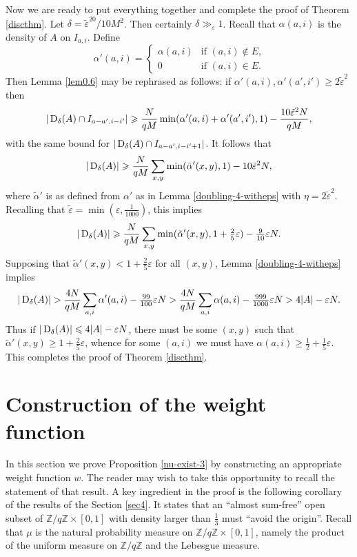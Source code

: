 \documentclass[10pt,reqno]{amsart}
\theoremstyle{definition}
\theoremstyle{remark}
\renewcommand{\leq}{\leqslant}
\renewcommand{\geq}{\geqslant}
\def\Z{\mathbb{Z}}
\def\eps{\varepsilon}
\numberwithin{equation}{section}
\begin{document}
Now we are ready to put everything together and complete the proof of Theorem \ref{discthm}. Let $\delta = {\tilde\eps}^{20}/10M^2$. Then certainly $\delta \gg_{\eps} 1$. Recall that $\alpha(a,i)$ is the density of $A$ on $I_{a,i}$. Define \[\alpha'(a,i) = \begin{cases} \alpha(a,i) & \text{if $(a,i)\notin E$,}\\ 0 & \text{if $(a,i)\in E$.}\end{cases}\] Then Lemma \ref{lem0.6} may be rephrased as follows: if $\alpha'(a,i), \alpha'(a',i') \geq 2{\tilde\eps}^2$ then \[ |\Sym_{\delta}(A) \cap I_{a - a', i - i'}| \geq \frac{N}{qM} \min (\alpha'(a,i) + \alpha'(a',i'), 1) - \frac{10{\tilde\eps}^2 N}{qM},\] with the same bound for $|\operatorname{D}_{\delta}(A) \cap I_{a - a', i - i' + 1}|$. It follows that  \[ |\Sym_{\delta}(A)| \geq \frac{N}{qM} \sum_{x,y} \min(\tilde{\alpha}'(x,y),1) - 10{\tilde\eps}^2 N,\] where $\tilde{\alpha}'$ is as defined from $\alpha'$ as in Lemma \ref{doubling-4-witheps} with $\eta = 2{\tilde\eps}^2$. Recalling that $\tilde\eps = \min(\eps,\frac{1}{1000})$, this implies \[|\Sym_{\delta}(A)| \geq \frac{N}{qM} \sum_{x,y} \min(\tilde{\alpha}'(x,y),1 + \tfrac{2}{5}{\eps}) - \tfrac{9}{10}{\eps} N.\] Supposing that $\tilde\alpha'(x,y)<1+\tfrac{2}{5}{\eps}$ for all $(x,y)$, Lemma \ref{doubling-4-witheps} implies
\[ |\Sym_\delta(A)| > \frac{4N}{qM} \sum_{a,i} \alpha'(a,i) - \tfrac{99}{100}{\eps} N > \frac{4N}{qM} \sum_{a,i} \alpha(a,i) - \tfrac{999}{1000} \eps N > 4|A| - \eps N.\] Thus if $|\Sym_\delta(A)|\leq 4|A|-{\eps} N$, there must be some $(x,y)$ such that $\tilde\alpha'(x,y)\geq 1 + \tfrac{2}{5}{\eps}$, whence for some $(a,i)$ we must have $\alpha(a,i)\geq\tfrac{1}{2} + \tfrac{1}{5}{\eps}$. This completes the proof of Theorem \ref{discthm}.


\section{Construction of the weight function}

\label{sec5}

In this section we prove Proposition \ref{nu-exist-3} by constructing an appropriate weight function $w$. The reader may wish to take this opportunity to recall the statement of that result. A key ingredient in the proof is the following corollary of the results of the Section \ref{sec4}. It states that an ``almost sum-free'' open subset of $\Z/q\Z \times [0,1]$ with density larger than $\frac{1}{3}$ must ``avoid the origin''. Recall that $\mu$ is the natural probability measure on $\Z/q\Z \times [0,1]$, namely the product of the uniform measure on $\Z/q\Z$ and the Lebesgue measure. 
\end{document}
